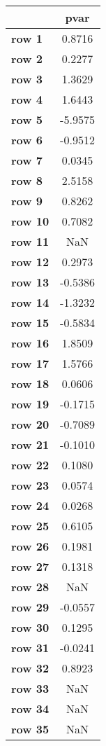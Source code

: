 \begin{tiny}\begin{tabular}{|l|c|}
\hline
&\textbf{pvar}\\\hline
\textbf{row 1}&0.8716\\\hline
\textbf{row 2}&0.2277\\\hline
\textbf{row 3}&1.3629\\\hline
\textbf{row 4}&1.6443\\\hline
\textbf{row 5}&-5.9575\\\hline
\textbf{row 6}&-0.9512\\\hline
\textbf{row 7}&0.0345\\\hline
\textbf{row 8}&2.5158\\\hline
\textbf{row 9}&0.8262\\\hline
\textbf{row 10}&0.7082\\\hline
\textbf{row 11}&NaN\\\hline
\textbf{row 12}&0.2973\\\hline
\textbf{row 13}&-0.5386\\\hline
\textbf{row 14}&-1.3232\\\hline
\textbf{row 15}&-0.5834\\\hline
\textbf{row 16}&1.8509\\\hline
\textbf{row 17}&1.5766\\\hline
\textbf{row 18}&0.0606\\\hline
\textbf{row 19}&-0.1715\\\hline
\textbf{row 20}&-0.7089\\\hline
\textbf{row 21}&-0.1010\\\hline
\textbf{row 22}&0.1080\\\hline
\textbf{row 23}&0.0574\\\hline
\textbf{row 24}&0.0268\\\hline
\textbf{row 25}&0.6105\\\hline
\textbf{row 26}&0.1981\\\hline
\textbf{row 27}&0.1318\\\hline
\textbf{row 28}&NaN\\\hline
\textbf{row 29}&-0.0557\\\hline
\textbf{row 30}&0.1295\\\hline
\textbf{row 31}&-0.0241\\\hline
\textbf{row 32}&0.8923\\\hline
\textbf{row 33}&NaN\\\hline
\textbf{row 34}&NaN\\\hline
\textbf{row 35}&NaN\\\hline

\end{tabular}
\end{tiny}
